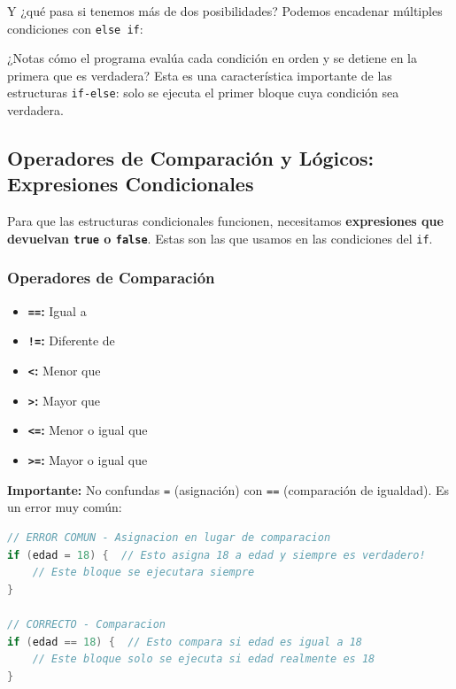 

Y ¿qué pasa si tenemos más de dos posibilidades? Podemos encadenar múltiples condiciones con \texttt{else if}:



¿Notas cómo el programa evalúa cada condición en orden y se detiene en la primera que es verdadera? Esta es una característica importante de las estructuras \texttt{if-else}: solo se ejecuta el primer bloque cuya condición sea verdadera.

\subsection{Operadores de Comparación y Lógicos: Expresiones Condicionales}\label{subsec:operadores_comparacion_logicos}

Para que las estructuras condicionales funcionen, necesitamos \textbf{expresiones que devuelvan \texttt{true} o \texttt{false}}. Estas son las que usamos en las condiciones del \texttt{if}.

\subsubsection{Operadores de Comparación}
\begin{itemize}
    \item \textbf{\texttt{==}:} Igual a
    \item \textbf{\texttt{!=}:} Diferente de
    \item \textbf{\texttt{<}:} Menor que
    \item \textbf{\texttt{>}:} Mayor que
    \item \textbf{\texttt{<=}:} Menor o igual que
    \item \textbf{\texttt{>=}:} Mayor o igual que
\end{itemize}

\textbf{Importante:} No confundas \texttt{=} (asignación) con \texttt{==} (comparación de igualdad). Es un error muy común:

\begin{lstlisting}[language=C++]
// ERROR COMUN - Asignacion en lugar de comparacion
if (edad = 18) {  // Esto asigna 18 a edad y siempre es verdadero!
    // Este bloque se ejecutara siempre
}

// CORRECTO - Comparacion
if (edad == 18) {  // Esto compara si edad es igual a 18
    // Este bloque solo se ejecuta si edad realmente es 18
}
\end{lstlisting}

